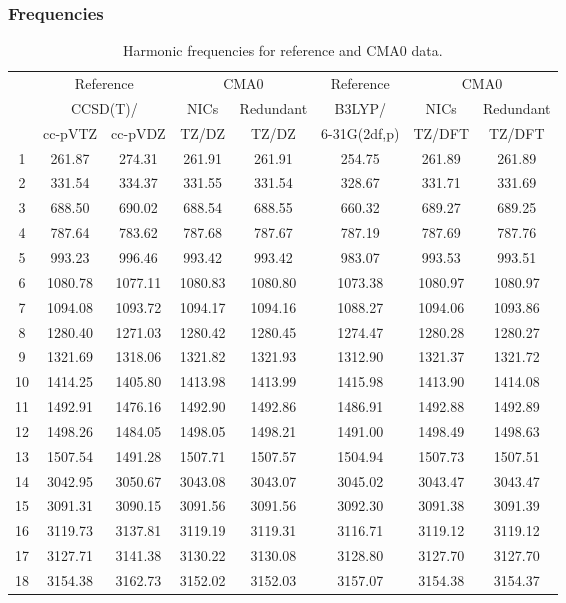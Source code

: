 \documentclass[10pt,oneside]{article}
\begin{document}
\begin{table}[h!]
\subsubsection*{Frequencies}
\centering
\caption{Harmonic frequencies for reference and CMA0 data.}
\begin{tabular}{cccccccc}
\toprule
{} & \multicolumn{2}{c}{Reference} & \multicolumn{2}{c}{CMA0} &    Reference & \multicolumn{2}{c}{CMA0} \\
{} & \multicolumn{2}{c}{CCSD(T)/} &    NICs &  Redundant &       B3LYP/ &    NICs & Redundant \\
{} &   cc-pVTZ & cc-pVDZ &   TZ/DZ &      TZ/DZ & 6-31G(2df,p) &  TZ/DFT &    TZ/DFT \\
\midrule
1  &    261.87 &  274.31 &  261.91 &     261.91 &       254.75 &  261.89 &    261.89 \\
2  &    331.54 &  334.37 &  331.55 &     331.54 &       328.67 &  331.71 &    331.69 \\
3  &    688.50 &  690.02 &  688.54 &     688.55 &       660.32 &  689.27 &    689.25 \\
4  &    787.64 &  783.62 &  787.68 &     787.67 &       787.19 &  787.69 &    787.76 \\
5  &    993.23 &  996.46 &  993.42 &     993.42 &       983.07 &  993.53 &    993.51 \\
6  &   1080.78 & 1077.11 & 1080.83 &    1080.80 &      1073.38 & 1080.97 &   1080.97 \\
7  &   1094.08 & 1093.72 & 1094.17 &    1094.16 &      1088.27 & 1094.06 &   1093.86 \\
8  &   1280.40 & 1271.03 & 1280.42 &    1280.45 &      1274.47 & 1280.28 &   1280.27 \\
9  &   1321.69 & 1318.06 & 1321.82 &    1321.93 &      1312.90 & 1321.37 &   1321.72 \\
10 &   1414.25 & 1405.80 & 1413.98 &    1413.99 &      1415.98 & 1413.90 &   1414.08 \\
11 &   1492.91 & 1476.16 & 1492.90 &    1492.86 &      1486.91 & 1492.88 &   1492.89 \\
12 &   1498.26 & 1484.05 & 1498.05 &    1498.21 &      1491.00 & 1498.49 &   1498.63 \\
13 &   1507.54 & 1491.28 & 1507.71 &    1507.57 &      1504.94 & 1507.73 &   1507.51 \\
14 &   3042.95 & 3050.67 & 3043.08 &    3043.07 &      3045.02 & 3043.47 &   3043.47 \\
15 &   3091.31 & 3090.15 & 3091.56 &    3091.56 &      3092.30 & 3091.38 &   3091.39 \\
16 &   3119.73 & 3137.81 & 3119.19 &    3119.31 &      3116.71 & 3119.12 &   3119.12 \\
17 &   3127.71 & 3141.38 & 3130.22 &    3130.08 &      3128.80 & 3127.70 &   3127.70 \\
18 &   3154.38 & 3162.73 & 3152.02 &    3152.03 &      3157.07 & 3154.38 &   3154.37 \\
\bottomrule
\end{tabular}
\end{table}
\end{document}
